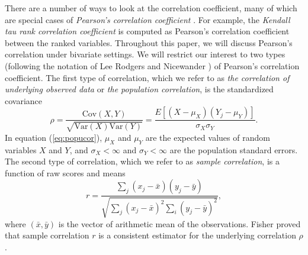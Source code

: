 \documentclass[review]{elsarticle}
\newcommand{\cov}{\text{Cov}}
\newcommand{\var}{\text{Var}}
\newcommand{\samplecor}{sample correlation}
\newcommand{\popucor}{the correlation of underlying observed data}
\begin{document}
	There are a number of ways to look at the correlation coefficient, many of which are special 
	cases of \textit{Pearson's correlation coefficient} 
	\citep{lee1988thirteen}. For example, the \textit{Kendall tau rank correlation coefficient} is 
	computed as Pearson's correlation coefficient between the ranked variables. Throughout this 
	paper, we will discuss Pearson's correlation under bivariate settings. We will restrict our 
	interest to two types (following the notation of Lee Rodgers and Nicewander \cite{lee1988thirteen}) of Pearson's 
	correlation coefficient.  The first type of correlation, which we refer to as 
	\textit{\popucor} or \textit{the population correlation}, is the standardized 
	covariance
	\begin{equation}\label{eq:popucor}
	\rho =\dfrac{\cov(X, Y)}{\sqrt{\var(X)\var(Y)}} = 
	\dfrac{E[(X-\mu_X)(Y_j-\mu_Y)]}{\sigma_X\sigma_Y}.
	\end{equation} 
	In equation (\ref{eq:popucor}), $\mu_X$ and $\mu_Y$ are the expected values of 
	random variables 
	$X$ and 
	$Y$,  and $\sigma_X<\infty$ and 
	$\sigma_Y<\infty$ are the population standard errors. The second type of correlation, which we 
	refer to as \textit{\samplecor}, is a function of raw scores and means
	\begin{equation}\label{eq:samplecor}
	r  =  \dfrac{\sum_j (x_j -\bar{x})(y_j - \bar{y})}{\sqrt{\sum_{j}(x_j - \bar{x})^2\sum_i(y_j - 
			\bar{y})^2}}, 
	\end{equation}
	where $(\bar{x}, \bar{y})$ is the vector of arithmetic mean of the observations. 
	Fisher \cite{fisher1915frequency} proved that sample correlation $r$ is a consistent 
	estimator for the underlying correlation $\rho$.
	
\end{document}

